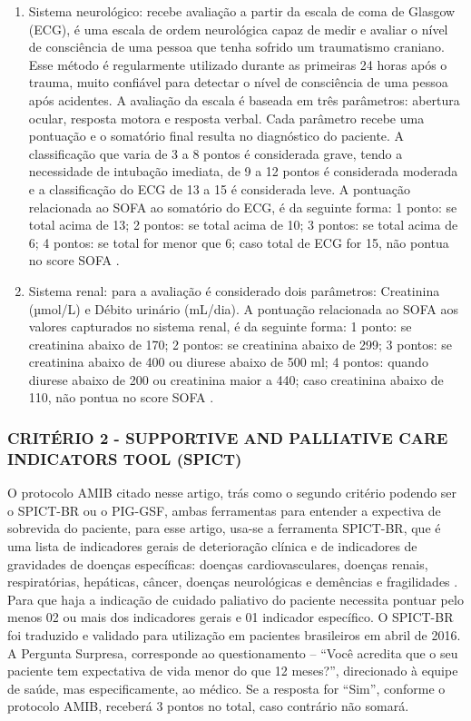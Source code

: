 \documentclass[12pt]{article}
\begin{document}
\begin{enumerate}
    \item Sistema neurológico: recebe avaliação a partir da escala de coma de Glasgow (ECG), é uma escala de ordem neurológica capaz de medir e avaliar o nível de consciência de uma pessoa que tenha sofrido um traumatismo craniano. Esse método é regularmente utilizado durante as primeiras 24 horas após o trauma, muito confiável para detectar o nível de consciência de uma pessoa após acidentes. A avaliação da escala é baseada em três parâmetros: abertura ocular, resposta motora e resposta verbal. Cada parâmetro recebe uma pontuação e o somatório final resulta no diagnóstico do paciente. A classificação que varia de 3 a 8 pontos é considerada grave, tendo a necessidade de intubação imediata, de 9 a 12 pontos é considerada moderada e a classificação do ECG de 13 a 15 é considerada leve. A pontuação relacionada ao SOFA ao somatório do ECG, é da seguinte forma: 1 ponto: se total acima de 13; 2 pontos: se total acima de 10; 3 pontos: se total acima de 6; 4 pontos: se total for menor que 6; caso total de ECG for 15, não pontua no score SOFA \cite{souza2021avaliaccao}.
    
    
    \item Sistema renal: para a avaliação é considerado dois parâmetros: Creatinina (µmol/L) e Débito urinário (mL/dia). A pontuação relacionada ao SOFA aos valores capturados no sistema renal, é da seguinte forma: 1 ponto: se creatinina abaixo de 170; 2 pontos: se creatinina abaixo de 299; 3 pontos: se creatinina abaixo de 400 ou diurese abaixo de 500 ml; 4 pontos: quando diurese abaixo de 200 ou creatinina maior a 440; caso creatinina abaixo de 110, não pontua no score SOFA \cite{lambden2019sofa}.
    
\end{enumerate}

\subsubsection{CRITÉRIO 2 - SUPPORTIVE AND PALLIATIVE CARE INDICATORS TOOL (SPICT)}

O protocolo AMIB citado nesse artigo, trás como o segundo critério podendo ser o SPICT-BR ou o PIG-GSF, ambas ferramentas para entender a expectiva de sobrevida do paciente, para esse artigo, usa-se a ferramenta SPICT-BR, que é uma lista de indicadores gerais de deterioração clínica e de indicadores de gravidades de doenças específicas: doenças cardiovasculares, doenças renais, respiratórias, hepáticas, câncer, doenças neurológicas e demências e fragilidades \cite{rodriguez2021pergunta}. Para que haja a indicação de cuidado paliativo do paciente necessita pontuar pelo menos 02 ou mais dos indicadores gerais e 01 indicador específico. O SPICT-BR foi traduzido e validado para utilização em pacientes brasileiros em abril de 2016. A Pergunta Surpresa, corresponde ao questionamento – “Você acredita que o seu paciente tem expectativa de vida menor do que 12 meses?”, direcionado à equipe de saúde, mas especificamente, ao médico. Se a resposta for “Sim”, conforme o protocolo AMIB, receberá 3 pontos no total, caso contrário não somará.
\end{document}

